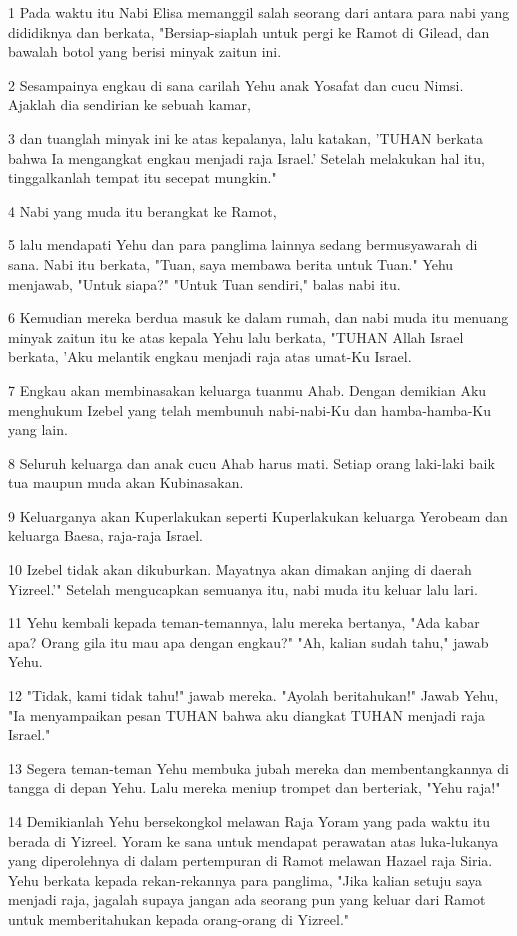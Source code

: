 \par 1 Pada waktu itu Nabi Elisa memanggil salah seorang dari antara para nabi yang dididiknya dan berkata, "Bersiap-siaplah untuk pergi ke Ramot di Gilead, dan bawalah botol yang berisi minyak zaitun ini.
\par 2 Sesampainya engkau di sana carilah Yehu anak Yosafat dan cucu Nimsi. Ajaklah dia sendirian ke sebuah kamar,
\par 3 dan tuanglah minyak ini ke atas kepalanya, lalu katakan, 'TUHAN berkata bahwa Ia mengangkat engkau menjadi raja Israel.' Setelah melakukan hal itu, tinggalkanlah tempat itu secepat mungkin."
\par 4 Nabi yang muda itu berangkat ke Ramot,
\par 5 lalu mendapati Yehu dan para panglima lainnya sedang bermusyawarah di sana. Nabi itu berkata, "Tuan, saya membawa berita untuk Tuan." Yehu menjawab, "Untuk siapa?" "Untuk Tuan sendiri," balas nabi itu.
\par 6 Kemudian mereka berdua masuk ke dalam rumah, dan nabi muda itu menuang minyak zaitun itu ke atas kepala Yehu lalu berkata, "TUHAN Allah Israel berkata, 'Aku melantik engkau menjadi raja atas umat-Ku Israel.
\par 7 Engkau akan membinasakan keluarga tuanmu Ahab. Dengan demikian Aku menghukum Izebel yang telah membunuh nabi-nabi-Ku dan hamba-hamba-Ku yang lain.
\par 8 Seluruh keluarga dan anak cucu Ahab harus mati. Setiap orang laki-laki baik tua maupun muda akan Kubinasakan.
\par 9 Keluarganya akan Kuperlakukan seperti Kuperlakukan keluarga Yerobeam dan keluarga Baesa, raja-raja Israel.
\par 10 Izebel tidak akan dikuburkan. Mayatnya akan dimakan anjing di daerah Yizreel.'" Setelah mengucapkan semuanya itu, nabi muda itu keluar lalu lari.
\par 11 Yehu kembali kepada teman-temannya, lalu mereka bertanya, "Ada kabar apa? Orang gila itu mau apa dengan engkau?" "Ah, kalian sudah tahu," jawab Yehu.
\par 12 "Tidak, kami tidak tahu!" jawab mereka. "Ayolah beritahukan!" Jawab Yehu, "Ia menyampaikan pesan TUHAN bahwa aku diangkat TUHAN menjadi raja Israel."
\par 13 Segera teman-teman Yehu membuka jubah mereka dan membentangkannya di tangga di depan Yehu. Lalu mereka meniup trompet dan berteriak, "Yehu raja!"
\par 14 Demikianlah Yehu bersekongkol melawan Raja Yoram yang pada waktu itu berada di Yizreel. Yoram ke sana untuk mendapat perawatan atas luka-lukanya yang diperolehnya di dalam pertempuran di Ramot melawan Hazael raja Siria. Yehu berkata kepada rekan-rekannya para panglima, "Jika kalian setuju saya menjadi raja, jagalah supaya jangan ada seorang pun yang keluar dari Ramot untuk memberitahukan kepada orang-orang di Yizreel."
